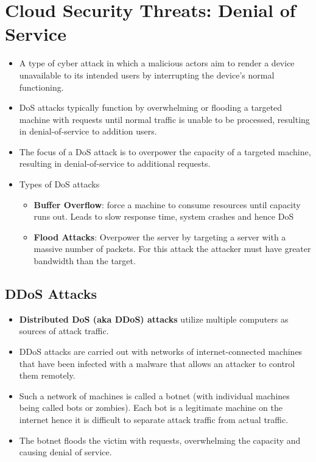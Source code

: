 \documentclass{article}
\begin{document}
\section{Cloud Security Threats: Denial of Service}
\begin{itemize}
    \item A type of cyber attack in which a malicious actors aim to render a device unavailable to its intended users by interrupting the device's normal functioning. 
    
    \item DoS attacks typically function by overwhelming or flooding a targeted machine with requests until normal traffic is unable to be processed, resulting in denial-of-service to addition users.
    
    \item The focus of a DoS attack is to overpower the capacity of a targeted machine, resulting in denial-of-service to additional requests.
    
    \item Types of DoS attacks
    \begin{itemize}
        \item \textbf{Buffer Overflow}: force a machine to consume resources until capacity runs out. Leads to slow response time, system crashes and hence DoS
        
        \item \textbf{Flood Attacks}: Overpower the server by targeting a server with a massive number of packets. For this attack the attacker must have greater bandwidth than the target. 
    \end{itemize}
\end{itemize}

\subsection{DDoS Attacks}
\begin{itemize}
    \item \textbf{Distributed DoS (aka DDoS) attacks} utilize multiple computers as sources of attack traffic.
    
    \item DDoS attacks are carried out with networks of internet-connected machines that have been infected with a malware that allows an attacker to control them remotely. 
    
    \item Such a network of machines is called a botnet (with individual machines being called bots or zombies). Each bot is a legitimate machine on the internet hence it is difficult to separate attack traffic from actual traffic. 
    
    \item The botnet floods the victim with requests, overwhelming the capacity and causing denial of service. 
\end{itemize}
\end{document}
